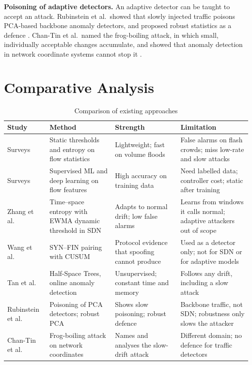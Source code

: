 \documentclass[12pt,a4paper,oneside]{report}
\begin{document}
\textbf{Poisoning of adaptive detectors.} An adaptive detector can be taught to accept an attack. Rubinstein et al.\ showed that slowly injected traffic poisons PCA-based backbone anomaly detectors, and proposed robust statistics as a defence \citep{rubinstein2009antidote}. Chan-Tin et al.\ named the frog-boiling attack, in which small, individually acceptable changes accumulate, and showed that anomaly detection in network coordinate systems cannot stop it \citep{chantin2009frog}.

\section{Comparative Analysis}
\begin{table}[htbp]\centering\caption{Comparison of existing approaches}\label{tab:literature}\begin{tabularx}{\textwidth}{lXXX}\toprule Study & Method & Strength & Limitation\\\midrule
Surveys \citep{sinha2025survey,wang_sdn_survey} & Static thresholds and entropy on flow statistics & Lightweight; fast on volume floods & False alarms on flash crowds; miss low-rate and slow attacks\\
Surveys \citep{sinha2025survey,wang_sdn_survey} & Supervised ML and deep learning on flow features & High accuracy on training data & Need labelled data; controller cost; static after training\\
Zhang et al.\ \citep{zhang2026time} & Time--space entropy with EWMA dynamic threshold in SDN & Adapts to normal drift; low false alarms & Learns from windows it calls normal; adaptive attackers out of scope\\
Wang et al.\ \citep{wang2002syn} & SYN--FIN pairing with CUSUM & Protocol evidence that spoofing cannot produce & Used as a detector only; not for SDN or for adaptive models\\
Tan et al.\ \citep{tan2011hst} & Half-Space Trees, online anomaly detection & Unsupervised; constant time and memory & Follows any drift, including a slow attack\\
Rubinstein et al.\ \citep{rubinstein2009antidote} & Poisoning of PCA detectors; robust PCA & Shows slow poisoning; robust defence & Backbone traffic, not SDN; robustness only slows the attacker\\
Chan-Tin et al.\ \citep{chantin2009frog} & Frog-boiling attack on network coordinates & Names and analyses the slow-drift attack & Different domain; no defence for traffic detectors\\
\bottomrule\end{tabularx}\end{table}
\end{document}
